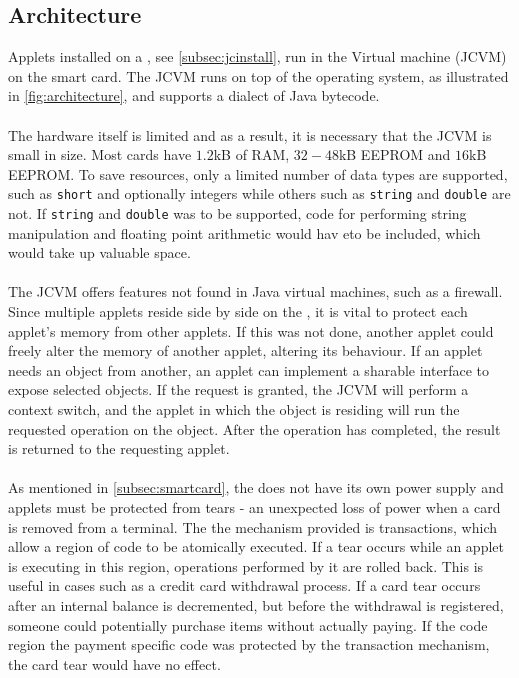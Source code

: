 \subsection{\jc Architecture}
Applets installed on a \jc, see \cref{subsec:jcinstall}, run in the \jc Virtual machine (JCVM) on the smart card. The JCVM runs on top of the operating system, as illustrated in \cref{fig:architecture},
and supports a dialect of Java bytecode.\\\\
The hardware itself is limited and as a result, it is necessary that the JCVM is small in size. Most cards have $1.2$kB of RAM, $32-48$kB EEPROM and $16$kB EEPROM. To save resources, only a limited number of data types are supported, such as \texttt{short} and optionally integers while others such as \texttt{string} and \texttt{double} are not. If \texttt{string} and \texttt{double} was to be supported, code for performing string manipulation and floating point arithmetic would hav eto be included, which would take up valuable space.\\\\
The JCVM offers features not found in Java virtual machines, such as a firewall. Since multiple applets reside side by side on the \jc, it is vital to protect each applet's memory from other applets. If this was not done, another applet could freely alter the memory of another applet, altering its behaviour. If an applet needs an object from another, an applet can implement a sharable interface to expose selected objects. If the request is granted, the JCVM will perform a context switch, and the applet in which the object is residing will run the requested operation on the object. After the operation has completed, the result is returned to the requesting applet.\\\\
As mentioned in \cref{subsec:smartcard}, the \jc does not have its own power supply and applets must be protected from tears - an unexpected loss of power when a card is removed from a terminal. The the mechanism provided is transactions, which allow a region of code to be atomically executed. If a tear occurs while an applet is executing in this region, operations performed by it are rolled back. This is useful in cases such as a credit card withdrawal process. If a card tear occurs after an internal balance is decremented, but before the withdrawal is registered, someone could potentially purchase items without actually paying. If the code region the payment specific code was protected by the transaction mechanism, the card tear would have no effect.\\\\
